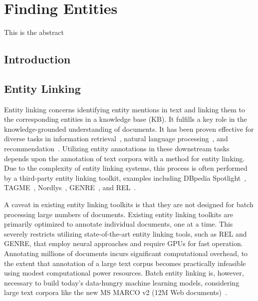 \chapter{Finding Entities}
\label{a-graph-of-entities}

\begin{Abstract}
	\begin{changemargin}{1cm}{1cm}
		This is the abstract  
	\end{changemargin}
\end{Abstract}

\section{Introduction}

\section{Entity Linking}
Entity linking concerns identifying entity mentions in text and linking them to the corresponding entities in a knowledge base (KB). It fulfills a key role in the knowledge-grounded understanding of documents. It has been proven effective for diverse tasks in information retrieval~\cite{Gerritse:2022:EMBERT, Gerritse:2020:GEER, doc-ranking-entity, el-ranking-hasibi, el-balog, query-recommendation-entity, chatterjee2022bert}, natural language processing~\cite{lin-etal-2012-entity, watson}, and recommendation~\cite{yang-etal-2018-collective}.
Utilizing entity annotations in these downstream tasks depends upon the annotation of text corpora with a method for entity linking. Due to the complexity of entity linking systems, this process is often performed by a third-party entity linking toolkit, examples including DBpedia Spotlight~\cite{dbpedia-spotlight}, TAGME~\cite{tagme}, Nordlys~\cite{nordlys}, GENRE~\cite{genre}, and REL~\cite{REL}. 

A caveat in existing entity linking toolkits is that they are not designed for batch processing large numbers of documents. Existing entity linking toolkits are primarily optimized to annotate individual documents, one at a time. This severely restricts utilizing state-of-the-art entity linking tools, such as REL and GENRE, that employ neural approaches and require GPUs for fast operation. Annotating millions of documents incurs significant computational overhead, to the extent that annotation of a large text corpus becomes practically infeasible using modest computational power resources. Batch entity linking is, however, necessary to build today's data-hungry machine learning models, considering large text corpora like the new MS MARCO v2 (12M Web documents)~\cite{msmarco}.

